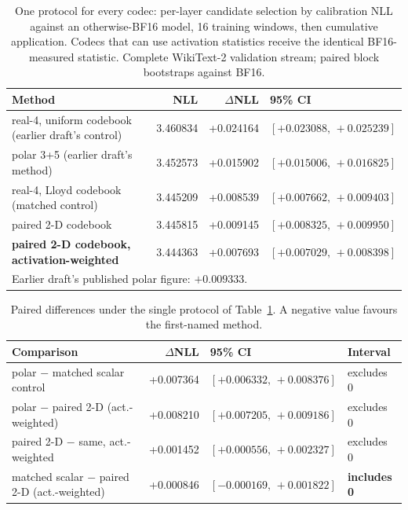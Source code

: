 \begin{table}[ht]
\centering\small
\setlength{\tabcolsep}{4pt}
\caption{One protocol for every codec: per-layer candidate selection by calibration NLL
against an otherwise-BF16 model, 16 training windows, then cumulative application.
Codecs that can use activation statistics receive the identical BF16-measured statistic.
Complete WikiText-2 validation stream; paired block bootstraps against BF16.}
\label{tab:fair}
\begin{tabular}{lrrl}\toprule
Method & NLL & $\Delta$NLL & 95\% CI\\\midrule
real-4, uniform codebook (earlier draft's control) & 3.460834 & +0.024164 & $[+0.023088,\,+0.025239]$\\
polar 3+5 (earlier draft's method) & 3.452573 & +0.015902 & $[+0.015006,\,+0.016825]$\\
real-4, Lloyd codebook (matched control) & 3.445209 & +0.008539 & $[+0.007662,\,+0.009403]$\\
paired 2-D codebook & 3.445815 & +0.009145 & $[+0.008325,\,+0.009950]$\\
\textbf{paired 2-D codebook, activation-weighted} & 3.444363 & +0.007693 & $[+0.007029,\,+0.008398]$\\
\midrule
\multicolumn{4}{l}{\footnotesize Earlier draft's published polar figure: $+0.009333$.}\\
\bottomrule
\end{tabular}
\end{table}

\begin{table}[ht]
\centering\small
\setlength{\tabcolsep}{4pt}
\caption{Paired differences under the single protocol of Table~\ref{tab:fair}.
A negative value favours the first-named method.}
\label{tab:fairhead}
\begin{tabular}{lrll}\toprule
Comparison & $\Delta$NLL & 95\% CI & Interval\\\midrule
polar $-$ matched scalar control & +0.007364 & $[+0.006332,\,+0.008376]$ & excludes 0\\
polar $-$ paired 2-D (act.-weighted) & +0.008210 & $[+0.007205,\,+0.009186]$ & excludes 0\\
paired 2-D $-$ same, act.-weighted & +0.001452 & $[+0.000556,\,+0.002327]$ & excludes 0\\
matched scalar $-$ paired 2-D (act.-weighted) & +0.000846 & $[-0.000169,\,+0.001822]$ & \textbf{includes 0}\\
\bottomrule
\end{tabular}
\end{table}
